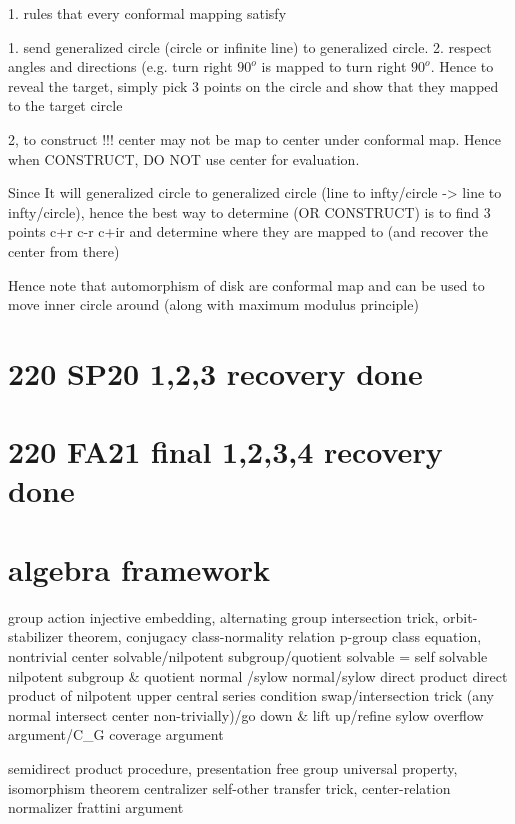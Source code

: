1. rules that every conformal mapping satisfy

    1. send generalized circle (circle or infinite line) to generalized circle.
    2. respect angles and directions (e.g. turn right $90^o$ is mapped to turn right $90^o$.
    Hence to reveal the target, simply pick 3 points on the circle and show that they mapped to the target circle


2, to construct
    !!! center may not be map to center under conformal map. Hence when CONSTRUCT, DO NOT use center for evaluation.

    Since It will generalized circle to generalized circle (line to infty/circle -> line to infty/circle), hence the best way to determine (OR CONSTRUCT) is to find 3 points c+r c-r c+ir and determine where they are mapped to (and recover the center from there)
     
    Hence note that automorphism of disk are conformal map and can be used to move inner circle around (along with maximum modulus principle)





\section*{220 SP20 1,2,3 recovery done}

\section*{220 FA21 final 1,2,3,4 recovery done}



\section*{algebra framework}
group action
    injective embedding, alternating group intersection trick, orbit-stabilizer theorem, conjugacy class-normality relation
p-group
    class equation, nontrivial center
solvable/nilpotent
    subgroup/quotient solvable = self solvable
    nilpotent subgroup & quotient normal /sylow normal/sylow direct product
    direct product of nilpotent
    upper central series condition swap/intersection trick (any normal intersect center non-trivially)/go down & lift up/refine
sylow
    overflow argument/C_G coverage argument
    
semidirect product
    procedure, presentation
free group 
    universal property, isomorphism theorem
centralizer
    self-other transfer trick, center-relation
normalizer
    frattini argument

